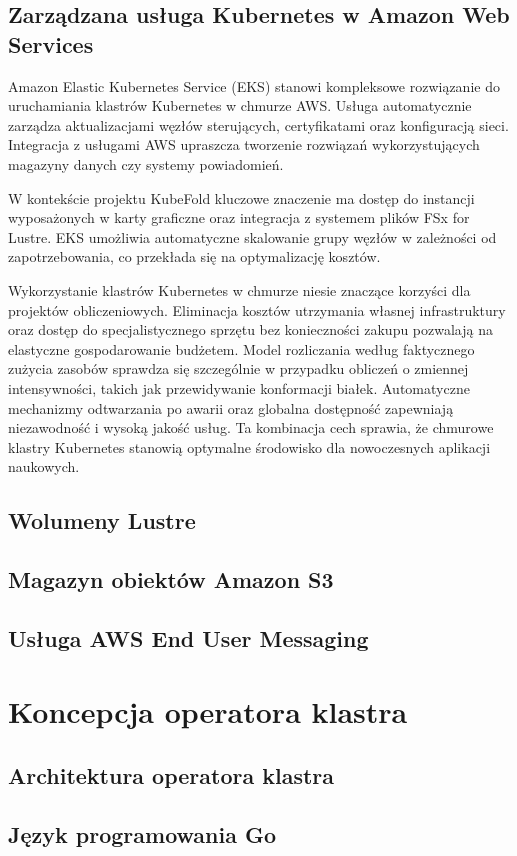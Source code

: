 \subsection{Zarządzana usługa Kubernetes w Amazon Web Services}

Amazon Elastic Kubernetes Service (EKS) stanowi kompleksowe rozwiązanie do uruchamiania klastrów Kubernetes w chmurze AWS.
Usługa automatycznie zarządza aktualizacjami węzłów sterujących, certyfikatami oraz konfiguracją sieci.
Integracja z usługami AWS upraszcza tworzenie rozwiązań wykorzystujących magazyny danych czy systemy powiadomień.

W kontekście projektu KubeFold kluczowe znaczenie ma dostęp do instancji wyposażonych w karty graficzne oraz integracja z systemem plików FSx for Lustre.
EKS umożliwia automatyczne skalowanie grupy węzłów w zależności od zapotrzebowania, co przekłada się na optymalizację kosztów.

Wykorzystanie klastrów Kubernetes w chmurze niesie znaczące korzyści dla projektów obliczeniowych.
Eliminacja kosztów utrzymania własnej infrastruktury oraz dostęp do specjalistycznego sprzętu bez konieczności zakupu pozwalają na elastyczne gospodarowanie budżetem.
Model rozliczania według faktycznego zużycia zasobów sprawdza się szczególnie w przypadku obliczeń o zmiennej intensywności, takich jak przewidywanie konformacji białek.
Automatyczne mechanizmy odtwarzania po awarii oraz globalna dostępność zapewniają niezawodność i wysoką jakość usług.
Ta kombinacja cech sprawia, że chmurowe klastry Kubernetes stanowią optymalne środowisko dla nowoczesnych aplikacji naukowych.

\subsection{Wolumeny Lustre}

\subsection{Magazyn obiektów Amazon S3}

\subsection{Usługa AWS End User Messaging}


\section{Koncepcja operatora klastra}

\subsection{Architektura operatora klastra}

\subsection{Język programowania Go}